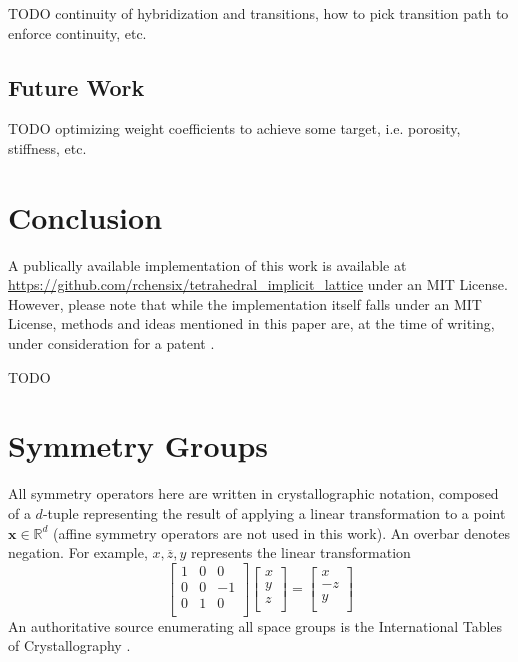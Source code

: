 \documentclass[acmtog]{acmart}
\begin{document}
TODO continuity of hybridization and transitions, how to pick transition path to enforce continuity, etc.

\subsection{Future Work}
TODO optimizing weight coefficients to achieve some target, i.e. porosity, stiffness, etc.

\section{Conclusion}

A publically available implementation of this work is available at \url{https://github.com/rchensix/tetrahedral_implicit_lattice} under an MIT License. However, please note that while the implementation itself falls under an MIT License, methods and ideas mentioned in this paper are, at the time of writing, under consideration for a patent \cite{chen2022}.

\begin{acks}
TODO
\end{acks}




\appendix

\section{Symmetry Groups}
\label{sec:symmetry_groups}
All symmetry operators here are written in crystallographic notation, composed of a $d$-tuple representing the result of applying a linear transformation to a point $\mathbf{x} \in \mathbb{R}^d$ (affine symmetry operators are not used in this work). An overbar denotes negation. For example, $x, \overline{z}, y$ represents the linear transformation
\begin{equation}
  \begin{bmatrix}
    1 & 0 & 0 \\
    0 & 0 & -1 \\
    0 & 1 & 0 \\
  \end{bmatrix}
  \begin{bmatrix}
    x \\
    y \\
    z \\
  \end{bmatrix}
  =
  \begin{bmatrix}
    x \\
    -z \\
    y \\
  \end{bmatrix}
\end{equation}
An authoritative source enumerating all space groups is the International Tables of Crystallography \cite{aroyo2016}.
\end{document}
